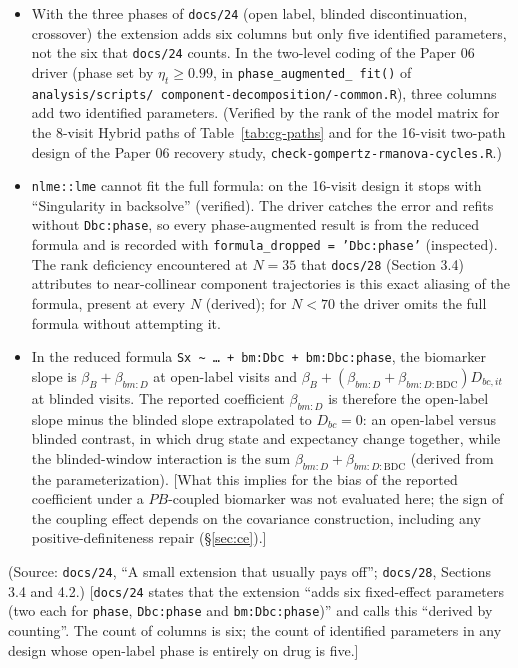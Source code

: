 \documentclass[11pt]{article}
\newcommand{\note}[1]{\textcolor{blue!60!black}{\small [#1]}}
\newcommand{\code}[1]{\texttt{#1}}
\begin{document}
\begin{itemize}[itemsep=2pt]
\item With the three phases of \code{docs/24} (open label, blinded
  discontinuation, crossover) the extension adds six columns but only
  five identified parameters, not the six that \code{docs/24} counts.
  In the two-level coding of the Paper 06 driver (phase set by
  $\eta_t \ge 0.99$, in \code{phase\_\allowbreak augmented\_\allowbreak
  fit()} of \code{analysis/\allowbreak scripts/\allowbreak
  component-decomposition/\allowbreak 00-common.R}), three columns add
  two identified parameters. (Verified by the rank of the model matrix
  for the 8-visit Hybrid paths of Table~\ref{tab:cg-paths} and for the
  16-visit two-path design of the Paper 06 recovery study,
  \code{check-gompertz-rmanova-cycles.R}.)
\item \code{nlme::lme} cannot fit the full formula: on the 16-visit
  design it stops with ``Singularity in backsolve'' (verified). The
  driver catches the error and refits without \code{Dbc:phase}, so
  every phase-augmented result is from the reduced formula and is
  recorded with
  \code{formula\_\allowbreak dropped = 'Dbc:phase'} (inspected).
  The rank deficiency encountered at $N = 35$ that \code{docs/28}
  (Section 3.4) attributes to near-collinear component trajectories is
  this exact aliasing of the formula, present at every $N$ (derived);
  for $N < 70$ the driver omits the full formula without attempting
  it.
\item In the reduced formula \code{Sx \textasciitilde\ \ldots\ +
  bm:Dbc + bm:Dbc:phase}, the biomarker slope is $\beta_B + \beta_{bm:D}$
  at open-label visits and $\beta_B + (\beta_{bm:D} +
  \beta_{bm:D:\mathrm{BDC}})D_{bc,it}$ at blinded visits. The reported
  coefficient $\beta_{bm:D}$ is therefore the open-label slope minus
  the blinded slope extrapolated to $D_{bc} = 0$: an open-label versus
  blinded contrast, in which drug state and expectancy change
  together, while the blinded-window interaction is the sum
  $\beta_{bm:D} + \beta_{bm:D:\mathrm{BDC}}$ (derived from the
  parameterization). \note{What this implies for the bias of the
  reported coefficient under a $PB$-coupled biomarker was not
  evaluated here; the sign of the coupling effect depends on the
  covariance construction, including any positive-definiteness repair
  (\S\ref{sec:ce}).}
\end{itemize}

(Source: \code{docs/24}, ``A small extension that usually pays off'';
\code{docs/28}, Sections 3.4 and 4.2.) \note{\code{docs/24} states that
the extension ``adds six fixed-effect parameters (two each for
\code{phase}, \code{Dbc:phase} and \code{bm:Dbc:phase})'' and calls
this ``derived by counting''. The count of columns is six; the count
of identified parameters in any design whose open-label phase is
entirely on drug is five.}
\end{document}
